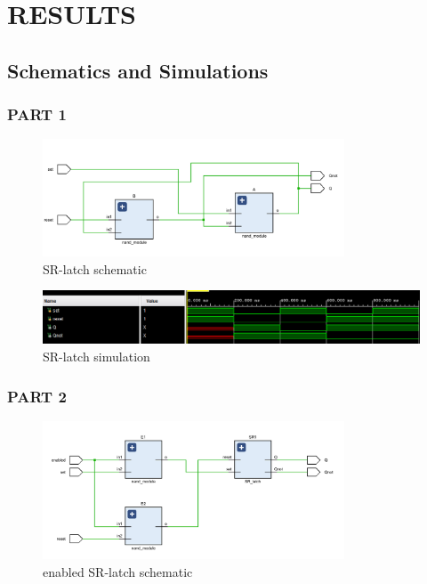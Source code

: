 \documentclass[pdftex,12pt,a4paper]{article}
\begin{document}
\section{RESULTS}
\subsection{Schematics and Simulations}

\subsubsection{PART 1}
    \begin{figure}[H]
    	\centering
    	\includegraphics[width=0.8\textwidth]{schematic/sr_schem.png}	
    	\caption{SR-latch schematic}
    	\label{SR-latch schematic}
    \end{figure}
    
    \begin{figure}[H]
    	\centering
    	\includegraphics[width=1\textwidth]{simulations/sr_sim.png}	
    	\caption{SR-latch simulation}
    	\label{SR-latch simulation}
    \end{figure}
    
\subsubsection{PART 2}
\begin{figure}[H]
    	\centering
    	\includegraphics[width=0.8\textwidth]{schematic/enabled_sr.png}	
    	\caption{enabled SR-latch schematic}
    	\label{enabled SR-latch schematic}
    \end{figure}
    
\end{document}

